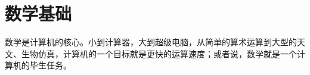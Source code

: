 \documentclass[../build/book.tex]{subfiles}
\begin{document}
\chapter{数学基础}

数学是计算机的核心。小到计算器，大到超级电脑，从简单的算术运算到大型的天文、生物仿真，计算机的一个目标就是更快的运算速度；或者说，数学就是一个计算机的毕生任务。
\end{document}
